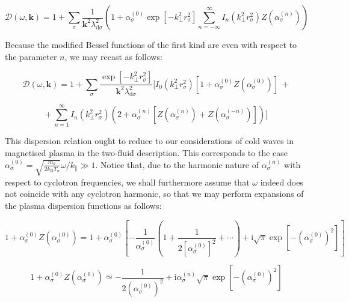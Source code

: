 \begin{equation}
    \mathcal{D}(\omega,\mathbf{k})=1+\sum_{\sigma}\frac{1}{\mathbf{k}^2\lambda_{\mathrm{d}\sigma}^2}\left(1+\alpha_\sigma^{(0)}\exp{\left[-k_\perp^2r_\sigma^2\right]\sum_{n=-\infty}^\infty}I_n(k_\perp^2r_\sigma^2)Z\left(\alpha_\sigma^{(n)}\right)\right)
\end{equation}

Because the modified Bessel functions of the first kind are even with respect to the parameter $n$, we may recast as follows:

\begin{equation}
    \mathcal{D}(\omega,\mathbf{k})=1+\sum_{\sigma}\frac{\exp{\left[-k_\perp^2r_\sigma^2\right]}}{\mathbf{k}^2\lambda_{\mathrm{d}\sigma}^2}\Bigg[I_0(k_\perp^2r_\sigma^2)\left[1+\alpha_\sigma^{(0)}Z\left(\alpha_\sigma^{(0)}\right)\right]\,+
\end{equation}

\begin{equation}
    +\,\sum_{n=1}^\infty I_n(k_\perp^2 r_\sigma^2)\left(2+\alpha_\sigma^{(n)}\left[Z\left(\alpha_\sigma^{(n)}\right)+Z\left(\alpha_\sigma^{(-n)}\right)\right]\right)\Bigg]
\end{equation}

This dispersion relation ought to reduce to our considerations of cold waves in magnetised plasma in the two-fluid description. This corresponds to the case $\alpha_\sigma^{(0)}=\sqrt{\frac{m_\sigma}{2k_\mathrm{B}T_\sigma}}\omega/k_\parallel\gg1$. Notice that, due to the harmonic nature of $\alpha_\sigma^{(n)}$ with respect to cyclotron frequencies, we shall furthermore assume that $\omega$ indeed does not coincide with any cyclotron harmonic, so that we may perform expansions of the plasma dispersion functions as follows:

\begin{equation}
    1+\alpha_\sigma^{(0)}Z\left(\alpha_\sigma^{(0)}\right)=1+\alpha_\sigma^{(0)}\left[-\frac{1}{\alpha_\sigma^{(0)}}\left(1+\frac{1}{2\left[\alpha_\sigma^{(0)}\right]^2}+\cdots\right)+\mathrm{i}\sqrt{\pi}\exp{\left[-\left(\alpha_\sigma^{(0)}\right)^2\right]}\right]
\end{equation}

\begin{equation}
    1+\alpha_\sigma^{(0)}Z\left(\alpha_\sigma^{(0)}\right)\simeq-\frac{1}{2\left(\alpha_\sigma^{(0)}\right)^2}+\mathrm{i}\alpha_\sigma^{(n)}\sqrt{\pi}\exp{\left[-\left(\alpha_\sigma^{(0)}\right)^2\right]}
\end{equation}

